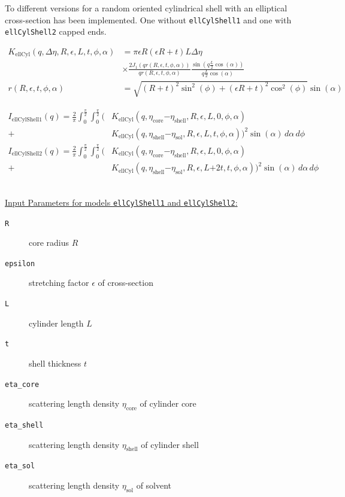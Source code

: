 To different versions for a random oriented cylindrical shell with
an elliptical cross-section has been implemented. One without
\texttt{ellCylShell1} and one with \texttt{ellCylShell2} capped
ends.

\begin{align}
K_\text{ellCyl}(q,\Delta\eta,R,\epsilon,L,t,\phi,\alpha) &= \pi \epsilon R(\epsilon R+t) L
\Delta \eta \\
    & \times \frac{2J_1\left(q r(R,\epsilon,t,\phi,\alpha) \right)}{q r(R,\epsilon,t,\phi,\alpha)}
    \frac{\sin(q \frac{L}{2}\cos(\alpha))}{q\frac{L}{2}\cos(\alpha)} \nonumber \\
r(R,\epsilon,t,\phi,\alpha) &= \sqrt{(R+t)^2\sin^2(\phi)+(\epsilon R+t)^2\cos^2(\phi)} \sin(\alpha)
\end{align}

\begin{align}
I_\text{ellCylShell1}(q) = \frac{2}{\pi}\int_0^{\frac{\pi}{2}} \!\! \int_0^{\frac{\pi}{2}} \biggl(
  &
  K_\text{ellCyl}\left(q,\eta_\text{core}\mathord-\eta_\text{shell},R,\epsilon,L,0,\phi,\alpha\right) \\
+&  K_\text{ellCyl}\left(q,\eta_\text{shell}\mathord-\eta_\text{sol},R,\epsilon,L,t,\phi,\alpha\right)
\biggr)^2 \sin(\alpha) \,d\alpha\, d\phi \nonumber \\
I_\text{ellCylShell2}(q) = \frac{2}{\pi}\int_0^{\frac{\pi}{2}} \!\!  \int_0^{\frac{\pi}{2}}  \biggl(
 &  K_\text{ellCyl}\left(q,\eta_\text{core}\mathord-\eta_\text{shell},R,\epsilon,L,0,\phi,\alpha\right) \\
+&  K_\text{ellCyl}\left(q,\eta_\text{shell}\mathord-\eta_\text{sol},R,\epsilon,L\mathord+2t,t,\phi,\alpha\right) \biggr)^2 \sin(\alpha) \,d\alpha \,d\phi  \nonumber
\end{align}


\vspace{5mm}

\hspace{1pt}\\
\uline{Input Parameters for models \texttt{ellCylShell1} and \texttt{ellCylShell2}:}\\
\begin{description}
\item[\texttt{R}] core radius $R$
\item[\texttt{epsilon}] stretching factor $\epsilon$ of cross-section
\item[\texttt{L}] cylinder length $L$
\item[\texttt{t}] shell thickness $t$
\item[\texttt{eta\_core}] scattering length density $\eta_\text{core}$ of cylinder core
\item[\texttt{eta\_shell}] scattering length density $\eta_\text{shell}$ of cylinder shell
\item[\texttt{eta\_sol}] scattering length density $\eta_\text{sol}$ of solvent
\end{description}

